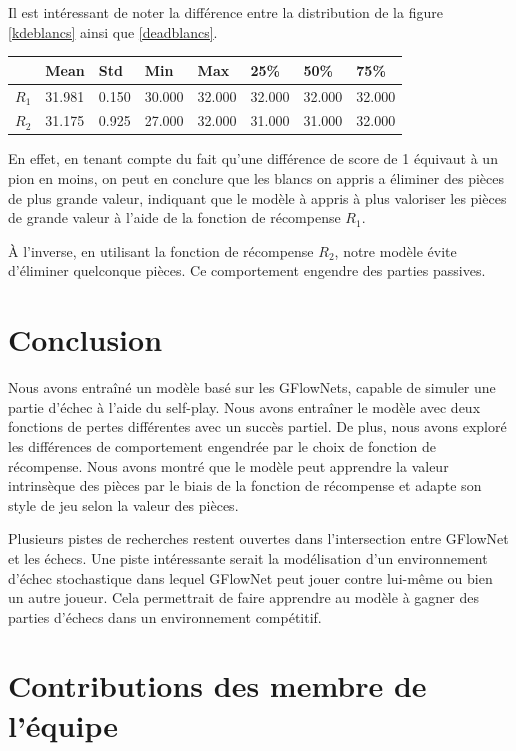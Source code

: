\documentclass[11pt]{article}
\begin{document}
Il est intéressant de noter la différence entre la distribution de la
figure \ref{kdeblancs} ainsi que \ref{deadblancs}.
\begin{table}[!ht]
  \centering
	\begin{tabular}{|l|l|l|l|l|l|l|l|}
	  \hline
	  ~     & Mean   & Std   & Min    & Max    & 25\%   & 50\%   & 75\%   \\ \hline
	  $R_1$ & 31.981 & 0.150 & 30.000 & 32.000 & 32.000 & 32.000 & 32.000 \\ \hline
	  $R_2$ & 31.175 & 0.925 & 27.000 & 32.000 & 31.000 & 31.000 & 32.000 \\ \hline
	\end{tabular}
\end{table}

En effet, en tenant compte du fait qu'une différence de score de 1
équivaut à un pion en moins, on peut en conclure que les blancs on
appris a éliminer des pièces de plus grande valeur, indiquant que le
modèle à appris à plus valoriser les pièces de grande valeur à l'aide
de la fonction de récompense $R_{1}$.

À l'inverse, en utilisant la fonction de récompense $R_{2}$, notre
modèle évite d'éliminer quelconque pièces. Ce comportement engendre
des parties passives.

\section*{Conclusion}
Nous avons entraîné un modèle basé sur les GFlowNets, capable de
simuler une partie d'échec à l'aide du self-play. Nous avons entraîner
le modèle avec deux fonctions de pertes différentes avec un succès
partiel. De plus, nous avons exploré les différences de comportement
engendrée par le choix de fonction de récompense. Nous avons montré
que le modèle peut apprendre la valeur intrinsèque des pièces par le
biais de la fonction de récompense et adapte son style de jeu selon la
valeur des pièces.

Plusieurs pistes de recherches restent ouvertes dans l'intersection
entre GFlowNet et les échecs. Une piste intéressante serait la
modélisation d'un environnement d'échec stochastique dans lequel
GFlowNet peut jouer contre lui-même ou bien un autre joueur. Cela
permettrait de faire apprendre au modèle à gagner des parties
d'échecs dans un environnement compétitif.


\section*{Contributions des membre de l'équipe}
\end{document}
